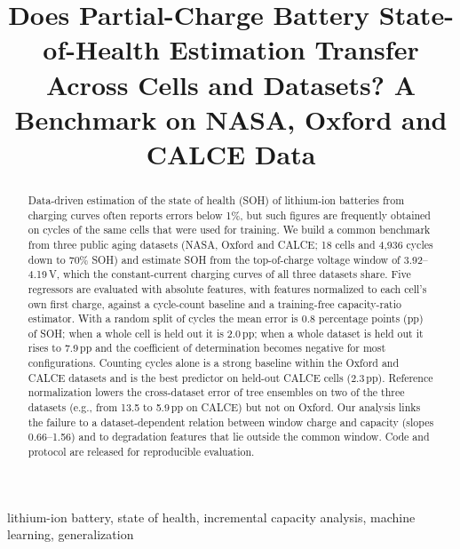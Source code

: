 \documentclass[conference]{IEEEtran}
\begin{document}
\title{Does Partial-Charge Battery State-of-Health Estimation Transfer Across Cells and Datasets? A Benchmark on NASA, Oxford and CALCE Data}

\author{
}

\maketitle

\begin{abstract}
Data-driven estimation of the state of health (SOH) of lithium-ion batteries from charging curves often reports errors below 1\%, but such figures are frequently obtained on cycles of the same cells that were used for training. We build a common benchmark from three public aging datasets (NASA, Oxford and CALCE; 18 cells and 4{,}936 cycles down to 70\% SOH) and estimate SOH from the top-of-charge voltage window of 3.92--4.19\,V, which the constant-current charging curves of all three datasets share. Five regressors are evaluated with absolute features, with features normalized to each cell's own first charge, against a cycle-count baseline and a training-free capacity-ratio estimator. With a random split of cycles the mean error is 0.8 percentage points (pp) of SOH; when a whole cell is held out it is 2.0\,pp; when a whole dataset is held out it rises to 7.9\,pp and the coefficient of determination becomes negative for most configurations. Counting cycles alone is a strong baseline within the Oxford and CALCE datasets and is the best predictor on held-out CALCE cells (2.3\,pp). Reference normalization lowers the cross-dataset error of tree ensembles on two of the three datasets (e.g., from 13.5 to 5.9\,pp on CALCE) but not on Oxford. Our analysis links the failure to a dataset-dependent relation between window charge and capacity (slopes 0.66--1.56) and to degradation features that lie outside the common window. Code and protocol are released for reproducible evaluation.
\end{abstract}

\begin{IEEEkeywords}
lithium-ion battery, state of health, incremental capacity analysis, machine learning, generalization
\end{IEEEkeywords}
\end{document}
